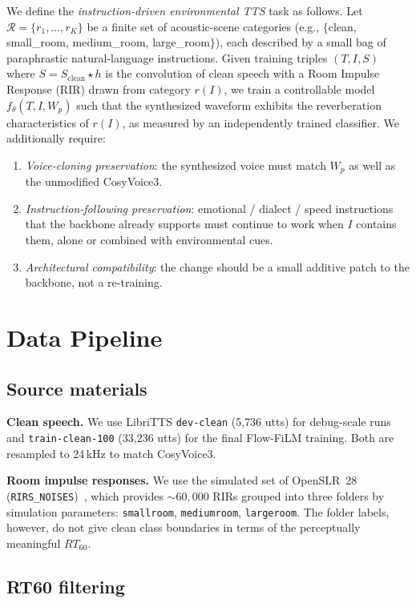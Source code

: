 \documentclass{article}
\begin{document}
We define the \emph{instruction-driven environmental TTS} task as follows. Let
$\mathcal{R}=\{r_1,\dots,r_K\}$ be a finite set of acoustic-scene categories
(e.g., $\{$clean, small\_room, medium\_room, large\_room$\}$), each described
by a small bag of paraphrastic natural-language instructions. Given training
triples $(T, I, S)$ where $S = S_{\text{clean}} \star h$ is the convolution of
clean speech with a Room Impulse Response (RIR) drawn from category
$r(I)$, we train a controllable model $f_\theta(T, I, W_p)$ such that the
synthesized waveform exhibits the reverberation characteristics of $r(I)$, as
measured by an independently trained classifier. We additionally require:
\begin{enumerate}
\item \emph{Voice-cloning preservation}: the synthesized voice must match
$W_p$ as well as the unmodified CosyVoice3.
\item \emph{Instruction-following preservation}: emotional / dialect /
speed instructions that the backbone already supports must continue to work
when $I$ contains them, alone or combined with environmental cues.
\item \emph{Architectural compatibility}: the change should be a small additive
patch to the backbone, not a re-training.
\end{enumerate}

\section{Data Pipeline}

\subsection{Source materials}

\textbf{Clean speech.} We use LibriTTS \texttt{dev-clean} (5{,}736 utts) for
debug-scale runs and \texttt{train-clean-100} (33{,}236 utts) for the final
Flow-FiLM training. Both are resampled to 24\,kHz to match CosyVoice3.

\textbf{Room impulse responses.} We use the simulated set of OpenSLR~28
(\texttt{RIRS\_NOISES})~\citep{ko2017rir}, which provides $\sim 60{,}000$
RIRs grouped into three folders by simulation parameters:
\texttt{smallroom}, \texttt{mediumroom}, \texttt{largeroom}. The folder
labels, however, do not give clean class boundaries in terms of the
perceptually meaningful $RT_{60}$.

\subsection{RT60 filtering}
\end{document}
